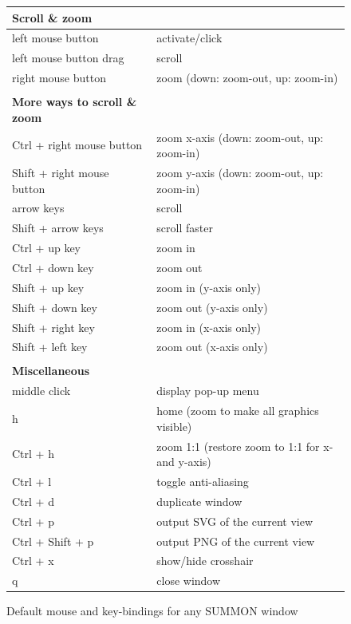 \documentclass[12pt]{article}
\begin{document}
\begin{figure}
\begin{center}
\footnotesize
\begin{tabular}{ll}

    {\bf Scroll \& zoom}     & \\ \hline 
    left mouse button          & activate/click \\
    left mouse button drag     & scroll \\
    right mouse button         & zoom (down: zoom-out, up: zoom-in)\\
    \\
    
    {\bf More ways to scroll \& zoom}     & \\ \hline 
    Ctrl + right mouse button  & zoom x-axis (down: zoom-out, up: zoom-in)\\
    Shift + right mouse button & zoom y-axis (down: zoom-out, up: zoom-in)\\
    arrow keys                 & scroll \\
    Shift + arrow keys         & scroll faster \\
    Ctrl + up key              & zoom in \\
    Ctrl + down key            & zoom out \\
    Shift + up key             & zoom in (y-axis only) \\
    Shift + down key           & zoom out (y-axis only) \\
    Shift + right key          & zoom in (x-axis only) \\
    Shift + left key           & zoom out (x-axis only) \\
    \\
    
    {\bf Miscellaneous} & \\ \hline
    middle click               & display pop-up menu \\    
    h                          & home (zoom to make all graphics visible) \\
    Ctrl + h                   & zoom 1:1 (restore zoom to 1:1 for x- and y-axis) \\
    Ctrl + l                   & toggle anti-aliasing \\
    Ctrl + d                   & duplicate window \\
    Ctrl + p                   & output SVG of the current view \\
    Ctrl + Shift + p           & output PNG of the current view \\
    Ctrl + x                   & show/hide crosshair \\
    q                          & close window \\
\end{tabular}
\end{center}
\caption{Default mouse and key-bindings for any SUMMON window}
\label{fig:bindings}
\end{figure}
\end{document}

